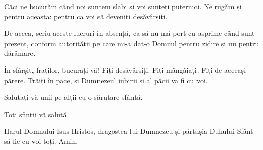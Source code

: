 {Căci ne bucurăm când noi suntem slabi și voi sunteți puternici. Ne rugăm și pentru aceasta: pentru ca voi să deveniți desăvârșiți.

De aceea, scriu aceste lucruri în absență, ca să nu mă port cu asprime când sunt prezent, conform autorității pe care mi-a dat-o Domnul pentru zidire și nu pentru dărâmare.


\par }{\PP {}În sfârșit, fraților, bucurați-vă! Fiți desăvârșiți. Fiți mângâiați. Fiți de aceeași părere. Trăiți în pace, și Dumnezeul iubirii și al păcii va fi cu voi.

Salutați-vă unii pe alții cu o sărutare sfântă.


\par }{\PP {}Toți sfinții vă salută.


\par }{\PP {}Harul Domnului Isus Hristos, dragostea lui Dumnezeu și părtășia Duhului Sfânt să fie cu voi toți. Amin.


\par }